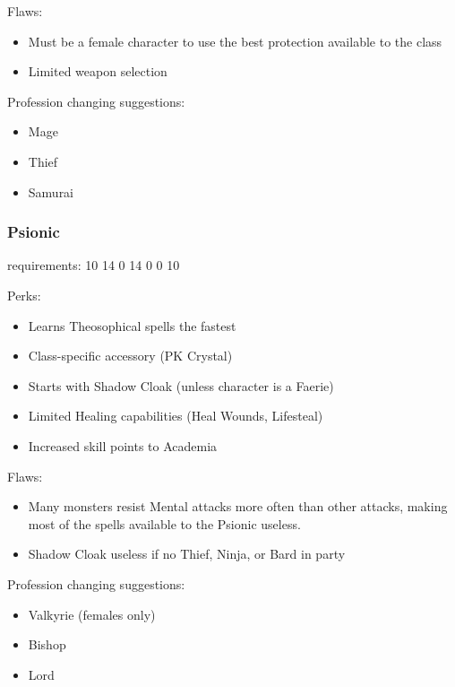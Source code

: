 \documentclass[12pt]{article}
\providecommand{\tightlist}{%
  \setlength{\itemsep}{0pt}\setlength{\parskip}{0pt}}
\begin{document}
Flaws:

\begin{itemize}
\item
  Must be a female character to use the best protection available to the
  class
\item
  Limited weapon selection
\end{itemize}

Profession changing suggestions:

\begin{itemize}
\item
  Mage
\item
  Thief
\item
  Samurai
\end{itemize}

\subsubsection{Psionic}\label{psionic}

requirements: 10 14 0 14 0 0 10

Perks:

\begin{itemize}
\item
  Learns Theosophical spells the fastest
\item
  Class-specific accessory (PK Crystal)
\item
  Starts with Shadow Cloak (unless character is a Faerie)
\item
  Limited Healing capabilities (Heal Wounds, Lifesteal)
\item
  Increased skill points to Academia
\end{itemize}

Flaws:

\begin{itemize}
\tightlist
\item
  Many monsters resist Mental attacks more often than other attacks,
  making most of the spells available to the Psionic useless.
\item
  Shadow Cloak useless if no Thief, Ninja, or Bard in party
\end{itemize}

Profession changing suggestions:

\begin{itemize}
\item
  Valkyrie (females only)
\item
  Bishop
\item
  Lord
\end{itemize}
\end{document}
